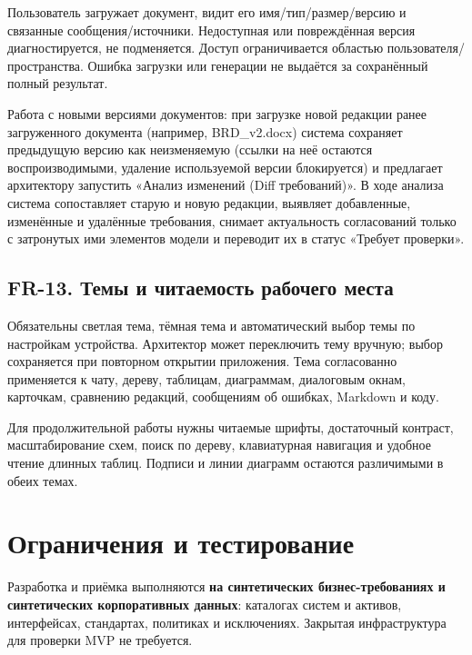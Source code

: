 \documentclass[10pt,a4paper]{article}
\begin{document}
Пользователь загружает документ, видит его имя/тип/размер/версию и связанные сообщения/источники. Недоступная или повреждённая версия диагностируется, не подменяется. Доступ ограничивается областью пользователя/пространства. Ошибка загрузки или генерации не выдаётся за сохранённый полный результат.

Работа с новыми версиями документов: при загрузке новой редакции ранее загруженного документа (например, BRD\_v2.docx) система сохраняет предыдущую версию как неизменяемую (ссылки на неё остаются воспроизводимыми, удаление используемой версии блокируется) и предлагает архитектору запустить «Анализ изменений (Diff требований)». В ходе анализа система сопоставляет старую и новую редакции, выявляет добавленные, изменённые и удалённые требования, снимает актуальность согласований только с затронутых ими элементов модели и переводит их в статус «Требует проверки».

\subsection{FR-13. Темы и читаемость рабочего места}\label{fr-13-ux442ux435ux43cux44b-ux438-ux447ux438ux442ux430ux435ux43cux43eux441ux442ux44c-ux440ux430ux431ux43eux447ux435ux433ux43e-ux43cux435ux441ux442ux430}

Обязательны светлая тема, тёмная тема и автоматический выбор темы по настройкам устройства. Архитектор может переключить тему вручную; выбор сохраняется при повторном открытии приложения. Тема согласованно применяется к чату, дереву, таблицам, диаграммам, диалоговым окнам, карточкам, сравнению редакций, сообщениям об ошибках, Markdown и коду.

Для продолжительной работы нужны читаемые шрифты, достаточный контраст, масштабирование схем, поиск по дереву, клавиатурная навигация и удобное чтение длинных таблиц. Подписи и линии диаграмм остаются различимыми в обеих темах.

\section{Ограничения и тестирование}\label{ux43eux433ux440ux430ux43dux438ux447ux435ux43dux438ux44f-ux438-ux442ux435ux441ux442ux438ux440ux43eux432ux430ux43dux438ux435}

Разработка и приёмка выполняются \textbf{на синтетических бизнес-требованиях и синтетических корпоративных данных}: каталогах систем и активов, интерфейсах, стандартах, политиках и исключениях. Закрытая инфраструктура для проверки MVP не требуется.
\end{document}
